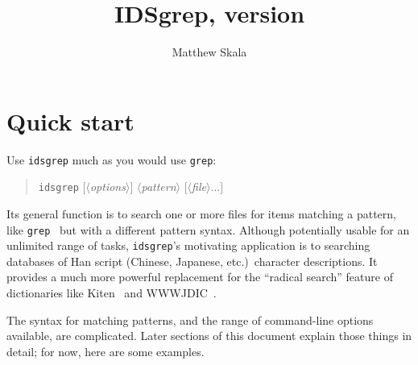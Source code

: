 \documentclass[twocolumn]{report}
\title{IDSgrep, version \idsgrepversion}
\author{Matthew Skala}
\makeatletter
\renewcommand\maketitle{%
  \begin{titlepage}%
    \let\footnotesize\small
    \let\footnoterule\relax
    \let \footnote \thanks
    \vspace*{\fill}
    \vspace*{\fill}
    {\sffamily\bfseries\huge \hfill\@title\hfill\null\par}
    \vspace{\fill}
    {\sffamily\bfseries\Large \hfill\@author\hfill\null\par}
    \vspace{\fill}
    \vspace{\fill}
    \vspace{\fill}
    \vspace{\fill}
    \vspace{\fill}
    {\sffamily\bfseries\Large \hfill\@date\par}
    \vspace*{\fill}
    \@thanks\par
    \null
  \end{titlepage}%
  \setcounter{footnote}{0}%
  \global\let\thanks\relax
  \global\let\maketitle\relax
  \global\let\@thanks\@empty
  \global\let\@author\@empty
  \global\let\@date\@empty
  \global\let\@title\@empty
  \global\let\title\relax
  \global\let\author\relax
  \global\let\date\relax
  \global\let\and\relax
}
\makeatother
\begin{document}
\maketitle

\renewcommand{\cfttoctitlefont}{%
  \huge\sffamily\bfseries}
\renewcommand{\cftaftertoctitle}{%
  {\huge\,\leaders\hrule height 0.2ex\hfill\null\vspace*{-4ex}}}

\def\gobbtohfil#1{%
  \begingroup\if#1\hfil\else\aftergroup\gobbtohfil\fi\endgroup}

\renewcommand{\cftchappresnum}{\gobbtohfil}
\renewcommand{\cftchapnumwidth}{0pt}
\renewcommand{\cftchapfont}{\sffamily\bfseries}
\renewcommand{\cftchappagefont}{\sffamily\bfseries}

\renewcommand{\cftsecpresnum}{\gobbtohfil}
\renewcommand{\cftsecnumwidth}{0pt}

\renewcommand{\cftsubsecpresnum}{\gobbtohfil}
\renewcommand{\cftsubsecnumwidth}{0pt}

\tableofcontents


\chapter{Quick start}

\noindent
Use \texttt{idsgrep} much as you would use \texttt{grep}:

\begin{quotation}
  \texttt{idsgrep}
    \textit{$[\langle$options$\rangle]$}
    \textit{$\langle$pattern$\rangle$}
    \textit{$[\langle$file$\rangle\ldots ]$}
\end{quotation}

Its general function is to search one or more files for items matching a
pattern, like \texttt{grep}~\cite{grep} but with a different pattern
syntax.  Although potentially usable for an unlimited range of tasks,
\texttt{idsgrep}'s motivating application is to searching databases of Han
script (Chinese, Japanese, etc.)\ character descriptions.  It provides a
much more powerful replacement for the ``radical search'' feature of
dictionaries like Kiten~\cite{Kiten} and WWWJDIC~\cite{WWWJDIC}.

The syntax for matching patterns, and the range of command-line options
available, are complicated.  Later sections of this document explain those
things in detail; for now, here are some examples.
\end{document}

